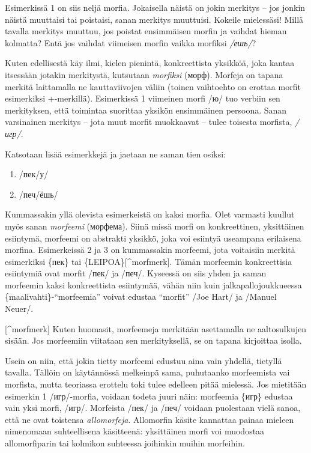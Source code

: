 \documentclass[]{scrartcl}
\providecommand{\tightlist}{%
  \setlength{\itemsep}{0pt}\setlength{\parskip}{0pt}}
\begin{document}
Esimerkissä 1 on siis neljä morfia. Jokaisella näistä on jokin merkitys
-- jos jonkin näistä muuttaisi tai poistaisi, sanan merkitys muuttuisi.
Kokeile mielessäsi! Millä tavalla merkitys muuttuu, jos poistat
ensimmäisen morfin ja vaihdat hieman kolmatta? Entä jos vaihdat
viimeisen morfin vaikka morfiksi \emph{/ешь/}?

Kuten edellisestä käy ilmi, kielen pienintä, konkreettista yksikköä,
joka kantaa itsessään jotakin merkitystä, kutsutaan \emph{morfiksi}
(морф). Morfeja on tapana merkitä laittamalla ne kauttaviivojen väliin
(toinen vaihtoehto on erottaa morfit esimerkiksi +-merkillä).
Esimerkissä 1 viimeinen morfi /ю/ tuo verbiin sen merkityksen, että
toimintaa suorittaa yksikön ensimmäinen persoona. Sanan varsinainen
merkitys -- jota muut morfit muokkaavat -- tulee toisesta morfista,
\emph{/игр/}.

Katsotaan lisää esimerkkejä ja jaetaan ne saman tien osiksi:

\begin{enumerate}
\def\labelenumi{(\arabic{enumi})}
\setcounter{enumi}{1}
\tightlist
\item
  /пек/у/
\item
  /печ/ёшь/
\end{enumerate}

Kummassakin yllä olevista esimerkeistä on kaksi morfia. Olet varmasti
kuullut myös sanan \emph{morfeemi} (морфема). Siinä missä morfi on
konkreettinen, yksittäinen esiintymä, morfeemi on abstrakti yksikkö,
joka voi esiintyä useampana erilaisena morfina. Esimerkeissä 2 ja 3 on
kummassakin morfeemi, jota voitaisiin merkitä esimerkiksi \{пек\} tai
\{LEIPOA\}{[}\^{}morfmerk{]}. Tämän morfeemin konkreettisia esiintymiä
ovat morfit /пек/ ja /печ/. Kyseessä on siis yhden ja saman morfeemin
kaksi konkreettista esiintymää, vähän niin kuin jalkapallojoukkueessa
\{maalivahti\}-``morfeemia'' voivat edustaa ``morfit'' /Joe Hart/ ja
/Manuel Neuer/.

{[}\^{}morfmerk{]} Kuten huomasit, morfeemeja merkitään asettamalla ne
aaltosulkujen sisään. Jos morfeemiin viitataan sen merkityksellä, se on
tapana kirjoittaa isolla.

Usein on niin, että jokin tietty morfeemi edustuu aina vain yhdellä,
tietyllä tavalla. Tällöin on käytännössä melkeinpä sama, puhutaanko
morfeemista vai morfista, mutta teoriassa erottelu toki tulee edelleen
pitää mielessä. Jos mietitään esimerkin 1 /игр/-morfia, voidaan todeta
juuri näin: morfeemia \{игр\} edustaa vain yksi morfi, /игр/. Morfeista
/пек/ ja /печ/ voidaan puolestaan vielä sanoa, että ne ovat toistensa
\emph{allomorfeja}. Allomorfin käsite kannattaa painaa mieleen
nimenomaan suhteellisena käsitteenä: yksittäinen morfi voi muodostaa
allomorfiparin tai kolmikon suhteessa joihinkin muihin morfeihin.
\end{document}
